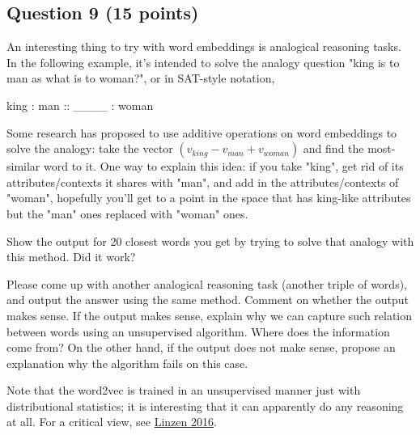 \documentclass[11pt]{article}
\begin{document}
    \subsection{Question 9 (15 points)}\label{question-9-15-points}

An interesting thing to try with word embeddings is analogical reasoning
tasks. In the following example, it's intended to solve the analogy
question "king is to man as what is to woman?", or in SAT-style
notation,

king : man :: \_\_\_\_ : woman

Some research has proposed to use additive operations on word embeddings
to solve the analogy: take the vector \((v_{king}-v_{man}+v_{woman})\)
and find the most-similar word to it. One way to explain this idea: if
you take "king", get rid of its attributes/contexts it shares with
"man", and add in the attributes/contexts of "woman", hopefully you'll
get to a point in the space that has king-like attributes but the "man"
ones replaced with "woman" ones.

Show the output for 20 closest words you get by trying to solve that
analogy with this method. Did it work?

Please come up with another analogical reasoning task (another triple of
words), and output the answer using the same method. Comment on whether
the output makes sense. If the output makes sense, explain why we can
capture such relation between words using an unsupervised algorithm.
Where does the information come from? On the other hand, if the output
does not make sense, propose an explanation why the algorithm fails on
this case.

Note that the word2vec is trained in an unsupervised manner just with
distributional statistics; it is interesting that it can apparently do
any reasoning at all. For a critical view, see
\href{http://www.aclweb.org/anthology/W/W16/W16-2503.pdf}{Linzen 2016}.
\end{document}
